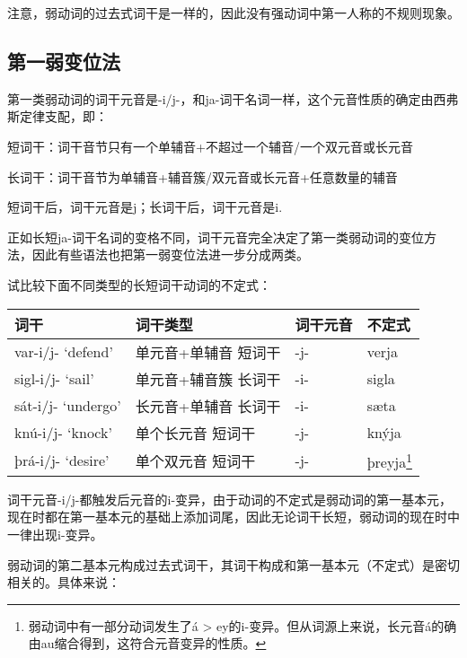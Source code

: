 注意，弱动词的过去式词干是一样的，因此没有强动词中第一人称的不规则现象。

\subsection{第一弱变位法}\label{第一弱变位法}

第一类弱动词的词干元音是-i/j-，和ja-词干名词一样，这个元音性质的确定由西弗斯定律支配，即：

\begin{info}
    短词干：词干音节只有一个单辅音+不超过一个辅音/一个双元音或长元音

    长词干：词干音节为单辅音+辅音簇/双元音或长元音+任意数量的辅音

    短词干后，词干元音是j；长词干后，词干元音是i.
\end{info}

正如长短ja-词干名词的变格不同，词干元音完全决定了第一类弱动词的变位方法，因此有些语法也把第一弱变位法进一步分成两类。

试比较下面不同类型的长短词干动词的不定式：

\begin{longtable}{llll}
    \toprule
    词干               & 词干类型             & 词干元音 & 不定式                                      \\
    \midrule
    \endhead
    \bottomrule
    \endfoot
    var-i/j- `defend‌'  & 单元音+单辅音 短词干 & -j-      & verja                                       \\
    sigl-i/j- `sail‌'   & 单元音+辅音簇 长词干 & -i-      & sigla                                       \\
    sát-i/j- `undergo‌' & 长元音+单辅音 长词干 & -i-      & sæta                                        \\
    knú-i/j- `knock'   & 单个长元音 短词干    & -j-      & knýja                                       \\
    þrá-i/j- `desire'  & 单个双元音 短词干    & -j-      & þreyja\footnote{弱动词中有一部分动词发生了á
    > ey的i-变异。但从词源上来说，长元音á的确由au缩合得到，这符合元音变异的性质。}                     \\
\end{longtable}

词干元音-i/j-都触发后元音的i-变异，由于动词的不定式是弱动词的第一基本元，现在时都在第一基本元的基础上添加词尾，因此无论词干长短，弱动词的现在时中一律出现i-变异。

弱动词的第二基本元构成过去式词干，其词干构成和第一基本元（不定式）是密切相关的。具体来说：

